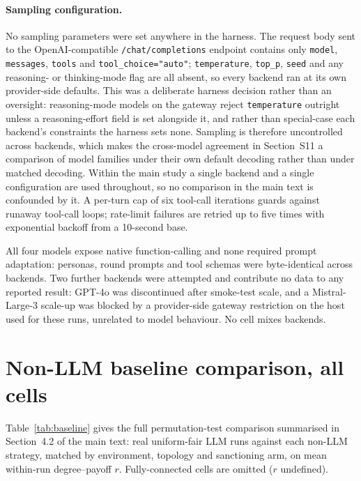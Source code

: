 \documentclass[11pt,a4paper]{article}
\newcommand{\code}[1]{\texttt{#1}}
\begin{document}
\paragraph{Sampling configuration.} No sampling parameters were set
anywhere in the harness. The request body sent to the
OpenAI-compatible \code{/chat/completions} endpoint contains only
\code{model}, \code{messages}, \code{tools} and
\code{tool\_choice="auto"}; \code{temperature}, \code{top\_p},
\code{seed} and any reasoning- or thinking-mode flag are all absent,
so every backend ran at its own provider-side defaults. This was a
deliberate harness decision rather than an oversight: reasoning-mode
models on the gateway reject \code{temperature} outright unless a
reasoning-effort field is set alongside it, and rather than special-case
each backend's constraints the harness sets none. Sampling is
therefore uncontrolled across backends, which makes the cross-model
agreement in Section~S11 a comparison of model families under their
own default decoding rather than under matched decoding. Within the
main study a single backend and a single configuration are used
throughout, so no comparison in the main text is confounded by it. A
per-turn cap of six tool-call iterations guards against runaway
tool-call loops; rate-limit failures are retried up to five times with
exponential backoff from a 10-second base.

All four models expose native function-calling and none required
prompt adaptation: personas, round prompts and tool schemas were
byte-identical across backends. Two further backends were attempted
and contribute no data to any reported result: GPT-4o was
discontinued after smoke-test scale, and a Mistral-Large-3 scale-up
was blocked by a provider-side gateway restriction on the host used
for these runs, unrelated to model behaviour. No cell mixes backends.

\section{Non-LLM baseline comparison, all cells}
\label{sec:s8}

Table~\ref{tab:baseline} gives the full permutation-test comparison
summarised in Section~4.2 of the main text: real uniform-fair LLM runs
against each non-LLM strategy, matched by environment, topology and
sanctioning arm, on mean within-run degree--payoff $r$. Fully-connected
cells are omitted ($r$ undefined).
\end{document}

